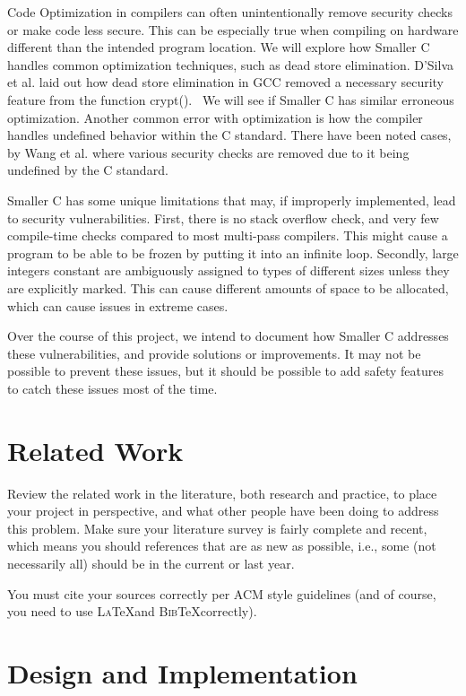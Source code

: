\documentclass[sigconf, anonymous]{acmart}
\def\BibTeX{\textsc{Bib}\TeX}
\def\LaTeX{\textsc{La}\TeX}
\begin{document}
Code Optimization in compilers can often unintentionally remove security checks or make code less secure. This can be especially true when compiling on hardware different than the intended program location. We will explore how Smaller C handles common optimization techniques, such as dead store elimination. D’Silva et al. laid out how dead store elimination in GCC removed a necessary security feature from the function crypt().~\cite{DSilva:Correctness} We will see if Smaller C has similar erroneous optimization. Another common error with optimization is how the compiler handles undefined behavior within the C standard. There have been noted cases, by Wang et al. where various security checks are removed due to it being undefined by the C standard.~\cite{Wang:Optimization}

Smaller C has some unique limitations that may, if improperly implemented, lead to security vulnerabilities. First, there is no stack overflow check, and very few compile-time checks compared to most multi-pass compilers. This might cause a program to be able to be frozen by putting it into an infinite loop. Secondly, large integers constant are ambiguously assigned to types of different sizes unless they are explicitly marked. This can cause different amounts of space to be allocated, which can cause issues in extreme cases.

Over the course of this project, we intend to document how Smaller C addresses these vulnerabilities, and provide solutions or improvements. It may not be possible to prevent these issues, but it should be possible to add safety features to catch these issues most of the time.

\section{Related Work}
\label{related work}

Review the related work in the literature, both research and practice,
to place your project in perspective, and what other people have been
doing to address this problem. Make sure your literature survey is
fairly complete and recent, which means you should references that are
as new as possible, i.e., some (not necessarily all) should be in the
current or last year.

You must cite your sources correctly per ACM style guidelines (and of
course, you need to use \LaTeX and \BibTeX correctly).

\section{Design and Implementation}
\label{design}
\end{document}
